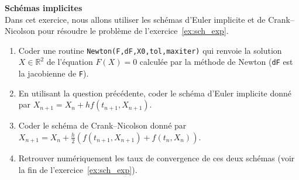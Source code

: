 \documentclass[12pt]{article}
\newcommand{\R}{\mathbb{R}}
\begin{document}
\newpage
\begin{exo}\textbf{Sch\'emas implicites}\\
  Dans cet exercice, nous allons utiliser les sch\'emas d'Euler implicite et de Crank--Nicolson
  pour r\'esoudre le probl\`eme de l'exercice~\ref{ex:sch_exp}.
\begin{enumerate}
\item Coder une routine \texttt{Newton(F,dF,X0,tol,maxiter)}
  qui renvoie la solution $X \in \R^2$ de l'\'equation $F(X) = 0$
  calcul\'ee par la m\'ethode de Newton (\texttt{dF} est la jacobienne de \texttt{F}).
\item En utilisant la question pr\'ec\'edente, coder le sch\'ema d'Euler implicite donn\'e par
  $X_{n+1} = X_n + h f(t_{n+1} , X_{n+1})$.
\item Coder le sch\'ema de Crank--Nicolson donn\'e par
  $X_{n+1} = X_n + \frac{h}2 (f(t_{n+1} , X_{n+1}) + f(t_{n} , X_{n}))$.
\item Retrouver num\'eriquement les taux de convergence de ces deux sch\'emas
  (voir la fin de l'exercice~\ref{ex:sch_exp}).
\end{enumerate}
\end{exo}
\end{document}
